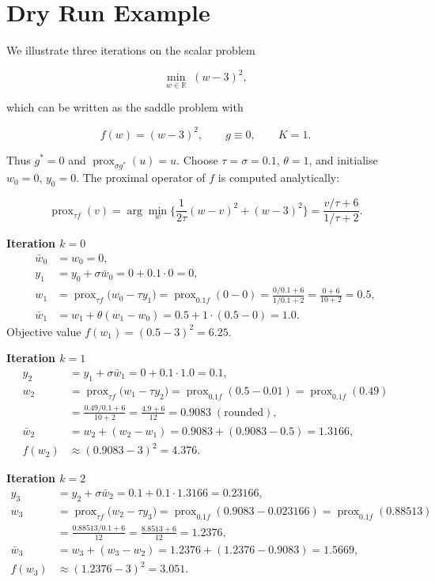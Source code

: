 \documentclass{article}
\newcommand{\prox}{\operatorname{prox}}
\begin{document}
\section*{Dry Run Example}
We illustrate three iterations on the scalar problem  

\[
\min_{w\in\mathbb{R}} \;(w-3)^{2},
\]

which can be written as the saddle problem with  

\[
f(w)=(w-3)^{2},\qquad g\equiv0,\qquad K=1.
\]

Thus $g^{*}=0$ and $\prox_{\sigma g^{*}}(u)=u$.  
Choose $\tau=\sigma=0.1$, $\theta=1$, and initialise $w_{0}=0$, $y_{0}=0$.
The proximal operator of $f$ is computed analytically:

\[
\prox_{\tau f}(v)=\arg\min_{w}\Big\{\frac{1}{2\tau}(w-v)^{2}+(w-3)^{2}\Big\}
               =\frac{v/\tau+6}{1/\tau+2}.
\tag{1}
\]

\medskip
\noindent\textbf{Iteration $k=0$}
\[
\begin{aligned}
\bar{w}_{0}&=w_{0}=0,\\
y_{1}&=y_{0}+\sigma\bar{w}_{0}=0+0.1\cdot0=0,\\
w_{1}&=\prox_{\tau f}\!\bigl(w_{0}-\tau y_{1}\bigr)
      =\prox_{0.1 f}(0-0)=\frac{0/0.1+6}{1/0.1+2}
      =\frac{0+6}{10+2}=0.5,\\
\bar{w}_{1}&=w_{1}+\theta(w_{1}-w_{0})=0.5+1\cdot(0.5-0)=1.0.
\end{aligned}
\]
Objective value $f(w_{1})=(0.5-3)^{2}=6.25$.

\medskip
\noindent\textbf{Iteration $k=1$}
\[
\begin{aligned}
y_{2}&=y_{1}+\sigma\bar{w}_{1}=0+0.1\cdot1.0=0.1,\\
w_{2}&=\prox_{\tau f}\!\bigl(w_{1}-\tau y_{2}\bigr)
      =\prox_{0.1 f}(0.5-0.01)=\prox_{0.1 f}(0.49)\\
     &=\frac{0.49/0.1+6}{10+2}
      =\frac{4.9+6}{12}=0.9083\;( \text{rounded}),\\
\bar{w}_{2}&=w_{2}+ (w_{2}-w_{1})
            =0.9083+(0.9083-0.5)=1.3166,\\
f(w_{2})&\approx(0.9083-3)^{2}=4.376.
\end{aligned}
\]

\medskip
\noindent\textbf{Iteration $k=2$}
\[
\begin{aligned}
y_{3}&=y_{2}+\sigma\bar{w}_{2}=0.1+0.1\cdot1.3166=0.23166,\\
w_{3}&=\prox_{\tau f}\!\bigl(w_{2}-\tau y_{3}\bigr)
      =\prox_{0.1 f}(0.9083-0.023166)=\prox_{0.1 f}(0.88513)\\
     &=\frac{0.88513/0.1+6}{12}
      =\frac{8.8513+6}{12}=1.2376,\\
\bar{w}_{3}&=w_{3}+ (w_{3}-w_{2})
            =1.2376+(1.2376-0.9083)=1.5669,\\
f(w_{3})&\approx(1.2376-3)^{2}=3.051.
\end{aligned}
\]
\end{document}

